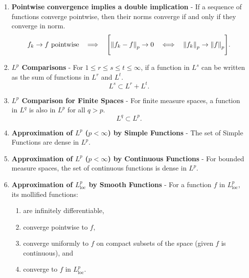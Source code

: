 \documentclass{article}
\begin{document}
\begin{enumerate}
\begin{enumerate}
            \end{enumerate}
        \item
            \textbf{Pointwise convergence implies a double implication} - If a sequence of functions converge pointwise, then their norms converge if and only if they converge in norm. $$f_k \rightarrow f \text{ pointwise}\ \ \implies\ \ \Bigg[\norm{f_k - f}_p \rightarrow 0\ \ \iff\ \ \norm{f_k}_p \rightarrow \norm{f}_p\Bigg].$$
        \item
            \textbf{$L^p$ Comparisons} - For $1 \leq r \leq s \leq t \leq \infty$, if a function in $L^s$ can be written as the sum of functions in $L^r$ and $L^t$.  $$L^s \subset L^r + L^t.$$
        \item
            \textbf{$L^p$ Comparison for Finite Spaces} - For finite measure spaces, a function in $L^q$ is also in $L^p$ for all $q > p$.  $$L^q \subset L^p.$$
        \item
            \textbf{Approximation of $L^p$ ($p<\infty$) by Simple Functions} - The set of Simple Functions are dense in $L^p$.
        \item
            \textbf{Approximation of $L^p$ ($p<\infty$) by Continuous Functions} - For bounded measure spaces, the set of continuous functions is dense in $L^p$.
        \item
            \textbf{Approximation of $L^p_{\text{loc}}$ by Smooth Functions} - For a function $f$ in $L^p_{\text{loc}}$, its mollified functions:
            \begin{enumerate}
                \item
                    are infinitely differentiable,
                \item
                    converge pointwise to $f$,
                \item
                    converge uniformly to $f$ on compact subsets of the space (given $f$ is continuous), and
                \item
                    converge to $f$ in $L^p_{\text{loc}}$.
            \end{enumerate}
    \end{enumerate}
\end{document}
